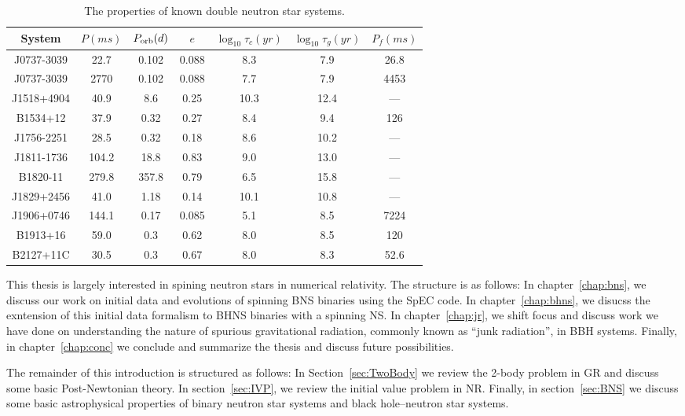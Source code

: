  
 \begin{table}
\centering
 \caption{The properties of known double neutron star systems.}
\label{tab:BNSPop}
 \begin{tabular}{c || c | c | c | c | c | c}
 \hline
 System & $P(ms)$ & $P_{\textnormal{orb}}(d)$ & $e$ & $\log_{10}{\tau_c(yr)}$ & $\log_{10}{\tau_g(yr)}$ & $P_f(ms)$ \\
 \hline \hline
 J0737-3039 & 22.7 & 0.102 & 0.088 & 8.3 & 7.9 & 26.8 \\
 J0737-3039 &  2770 & 0.102 & 0.088 & 7.7 & 7.9 &   4453 \\
 J1518+4904 & 40.9 & 8.6 & 0.25 & 10.3 & 12.4 & --- \\
 B1534+12 & 37.9 & 0.32 & 0.27 & 8.4 & 9.4 & 126 \\
 J1756-2251 & 28.5 & 0.32 & 0.18 & 8.6 & 10.2 & --- \\
 J1811-1736 & 104.2 & 18.8 & 0.83 & 9.0 & 13.0 & --- \\
 B1820-11 & 279.8 & 357.8 & 0.79 & 6.5 & 15.8 & --- \\
 J1829+2456 & 41.0 & 1.18 & 0.14 & 10.1 & 10.8 & --- \\
 J1906+0746 & 144.1 & 0.17 & 0.085 & 5.1 & 8.5 & 7224 \\
 B1913+16 & 59.0 & 0.3 & 0.62 & 8.0 & 8.5 & 120 \\
 B2127+11C & 30.5 & 0.3 & 0.67 & 8.0 & 8.3 & 52.6 \\ 
 \end{tabular}
 \end{table}
 

This thesis is largely interested in spining neutron stars in numerical relativity. The structure is as follows: In chapter~\ref{chap:bns}, we discuss our work on initial data and evolutions of spinning BNS binaries using the SpEC code. In chapter~\ref{chap:bhns}, we disucss the exntension of this initial data formalism to BHNS binaries with a spinning NS. In chapter~\ref{chap:jr}, we shift focus and discuss work we have done on understanding the nature of spurious gravitational radiation, commonly known as ``junk radiation'', in BBH systems. Finally, in chapter~\ref{chap:conc} we conclude and summarize the thesis and discuss future possibilities.

The remainder of this introduction is structured as follows: In Section~\ref{sec:TwoBody} we review the 2-body problem in GR and discuss some basic Post-Newtonian theory. In section~\ref{sec:IVP}, we review the initial value problem in NR. Finally, in section~\ref{sec:BNS} we discuss some basic astrophysical properties of binary neutron star systems and black hole--neutron star systems.

